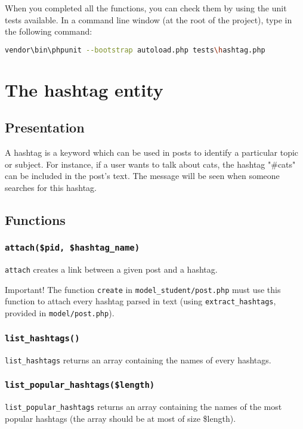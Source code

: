 \documentclass[twoside,a4paper,12pt]{article}
\begin{document}
When you completed all the functions, you can check them by using the unit tests available. In a command line window (at the root of the project), type in the following command:

\begin{lstlisting}[language=bash]
vendor\bin\phpunit --bootstrap autoload.php tests\hashtag.php
\end{lstlisting}

\section{The hashtag entity}

\subsection{Presentation}
A hashtag is a keyword which can be used in posts to identify a particular topic or subject. For instance, if a user wants to talk about cats, the hashtag "\#cats" can be included in the post's text. The message will be seen when someone searches for this hashtag.

\subsection{Functions}
\subsubsection{\texttt{attach(\$pid, \$hashtag\_name)}}
\texttt{attach} creates a link between a given post and a hashtag.

\begin{bclogo}[logo=\bcattention, noborder=true, barre=none]{Important!}
	The function \texttt{create} in \texttt{model\_student/post.php} must use this function to attach every hashtag parsed in text (using \texttt{extract\_hashtags}, provided in \texttt{model/post.php}).
\end{bclogo}

\subsubsection{\texttt{list\_hashtags()}}
\texttt{list\_hashtags} returns an array containing the names of every hashtags.

\subsubsection{\texttt{list\_popular\_hashtags(\$length)}}
\texttt{list\_popular\_hashtags} returns an array containing the names of the most popular hashtags (the array should be at most of size \$length).
\end{document}
